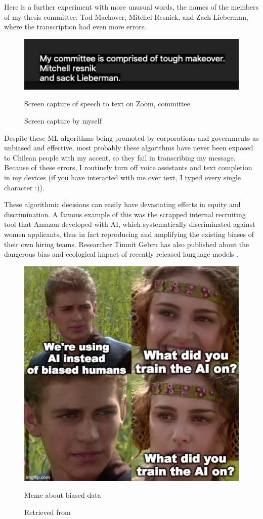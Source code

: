 Here is a further experiment with more unusual words, the names of the members of my thesis committee: Tod Machover, Mitchel Resnick, and Zach Lieberman, where the transcription had even more errors.

\begin{figure}[ht]
  \centering
  \includegraphics[width=0.75\linewidth,height=0.25\textheight,keepaspectratio]{images/zoom-committee.jpg}
  \caption{Screen capture of speech to text on Zoom, committee}
  \caption*{Screen capture by myself}
  \label{fig:zoom-committee}
\end{figure}

Despite these \acrshort{ML} algorithms being promoted by corporations and governments as unbiased and effective, most probably these algorithms have never been exposed to Chilean people with my accent, so they fail in transcribing my message. Because of these errors, I routinely turn off voice assistants and text completion in my devices (if you have interacted with me over text, I typed every single character :)).

These algorithmic decisions can easily have devastating effects in equity and discrimination. A famous example of this was the scrapped internal recruiting tool that Amazon developed with \acrshort{AI}, which systematically discriminated against women applicants, thus in fact reproducing and amplifying the existing biases of their own hiring teams\cite{website-reuters-news-amazon-ai-bias}. Researcher Timnit Gebru has also published about the dangerous bias and ecological impact of recently released language models \cite{wired-timnit-gebru-google}.

\begin{figure}[ht]
  \centering
  \includegraphics[width=0.75\linewidth,height=0.40\textheight,keepaspectratio]{images/meme-star-wars.jpg}
  \caption{Meme about biased data}
  \caption*{Retrieved from \cite{website-twitter-janellecshane-meme}}
  \label{fig:meme-star-wars}
\end{figure}

